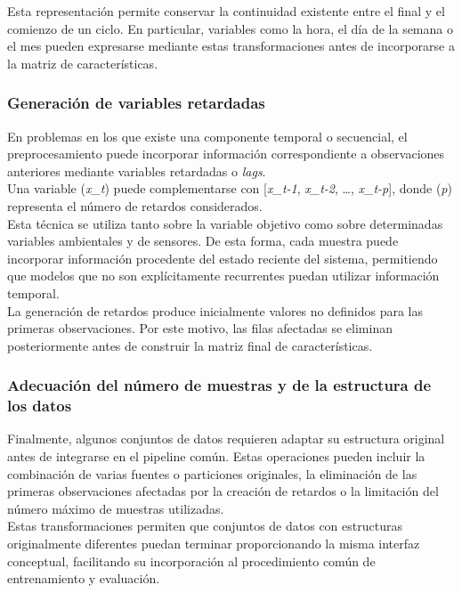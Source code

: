 \documentclass[a4paper,12pt,twoside,final]{book}
\begin{document}
Esta representación permite conservar la continuidad existente entre el final y el comienzo de un ciclo. En particular,
variables como la hora, el día de la semana o el mes pueden expresarse mediante estas transformaciones antes de
incorporarse a la matriz de características.

\subsubsection{Generación de variables retardadas}
En problemas en los que existe una componente temporal o secuencial, el preprocesamiento puede incorporar información
correspondiente a observaciones anteriores mediante variables retardadas o \textit{lags}.\\

Una variable (\textit{x\_t}) puede complementarse con [\textit{x\_{t-1}}, \textit{x\_{t-2}}, \ldots, \textit{x\_{t-p}}],
donde (\textit{p}) representa el número de retardos considerados.\\

Esta técnica se utiliza tanto sobre la variable objetivo como sobre determinadas variables ambientales y de sensores.
De esta forma, cada muestra puede incorporar información procedente del estado reciente del sistema, permitiendo que
modelos que no son explícitamente recurrentes puedan utilizar información temporal.\\

La generación de retardos produce inicialmente valores no definidos para las primeras observaciones. Por este motivo,
las filas afectadas se eliminan posteriormente antes de construir la matriz final de características.

\subsubsection{Adecuación del número de muestras y de la estructura de los datos}
Finalmente, algunos conjuntos de datos requieren adaptar su estructura original antes de integrarse en el pipeline
común. Estas operaciones pueden incluir la combinación de varias fuentes o particiones originales, la eliminación de
las primeras observaciones afectadas por la creación de retardos o la limitación del número máximo de muestras
utilizadas.\\

Estas transformaciones permiten que conjuntos de datos con estructuras originalmente diferentes puedan terminar
proporcionando la misma interfaz conceptual, facilitando su incorporación al procedimiento común de entrenamiento y
evaluación.
\end{document}
